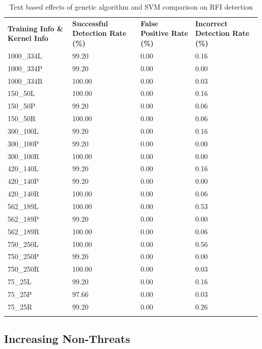 \begin{appendices}
\begin{longtable}{|p{1.5in}|p{1in}|p{1in}|p{1in}|}
	\hline
	\textbf{Training Info \& Kernel Info} & \textbf{Successful Detection Rate (\%)} & \textbf{False Positive Rate (\%)} & \textbf{Incorrect Detection Rate (\%)}  \\
	\hhline{|=|=|=|=|}
	1000\_334L &  99.20 & 0.00 & 0.16 \\ \hline
	1000\_334P &  99.20 & 0.00 & 0.00 \\ \hline
	1000\_334R & 100.00 & 0.00 & 0.03 \\ \hline
	150\_50L & 100.00 & 0.00 & 0.16 \\ \hline
	150\_50P &  99.20 & 0.00 & 0.06 \\ \hline
	150\_50R & 100.00 & 0.00 & 0.06 \\ \hline
	300\_100L &  99.20 & 0.00 & 0.16 \\ \hline
	300\_100P &  99.20 & 0.00 & 0.00 \\ \hline
	300\_100R & 100.00 & 0.00 & 0.00 \\ \hline
	420\_140L &  99.20 & 0.00 & 0.16 \\ \hline
	420\_140P &  99.20 & 0.00 & 0.00 \\ \hline
	420\_140R & 100.00 & 0.00 & 0.06 \\ \hline
	562\_189L & 100.00 & 0.00 & 0.53 \\ \hline
	562\_189P &  99.20 & 0.00 & 0.00 \\ \hline
	562\_189R & 100.00 & 0.00 & 0.06 \\ \hline
	750\_250L & 100.00 & 0.00 & 0.56 \\ \hline
	750\_250P &  99.20 & 0.00 & 0.00 \\ \hline
	750\_250R & 100.00 & 0.00 & 0.03 \\ \hline
	75\_25L &  99.20 & 0.00 & 0.16 \\ \hline
	75\_25P &  97.66 & 0.00 & 0.03 \\ \hline
	75\_25R &  99.20 & 0.00 & 0.26 \\ \hline
	\caption{Text based effects of genetic algorithm and SVM comparison on RFI detection}
\end{longtable}

\newpage
\subsection{Increasing Non-Threats}


\end{appendices}
